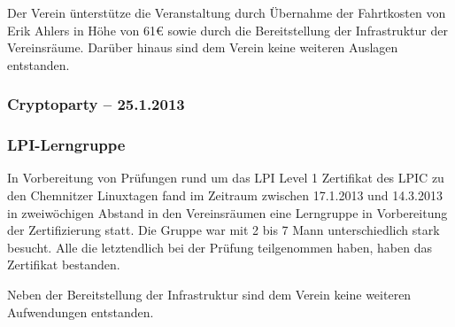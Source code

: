 \documentclass[10pt,DIV16]{scrartcl}
\begin{document}
Der Verein ünterstütze die Veranstaltung durch Übernahme der
Fahrtkosten von Erik Ahlers in Höhe von 61\euro{} sowie durch die
Bereitstellung der Infrastruktur der Vereinsräume. Darüber hinaus
sind dem Verein keine weiteren Auslagen entstanden.

\subsubsection{Cryptoparty -- 25.1.2013}

\subsubsection{LPI-Lerngruppe}

In Vorbereitung von Prüfungen rund um das LPI Level 1 Zertifikat des
LPIC zu den Chemnitzer Linuxtagen fand im Zeitraum zwischen
17.1.2013 und 14.3.2013 in zweiwöchigen Abstand in den Vereinsräumen
eine Lerngruppe in Vorbereitung der Zertifizierung statt. Die Gruppe
war mit 2 bis 7 Mann unterschiedlich stark besucht. Alle die
letztendlich bei der Prüfung teilgenommen haben, haben das
Zertifikat bestanden.

Neben der Bereitstellung der Infrastruktur sind dem Verein keine
weiteren Aufwendungen entstanden.
\end{document}
